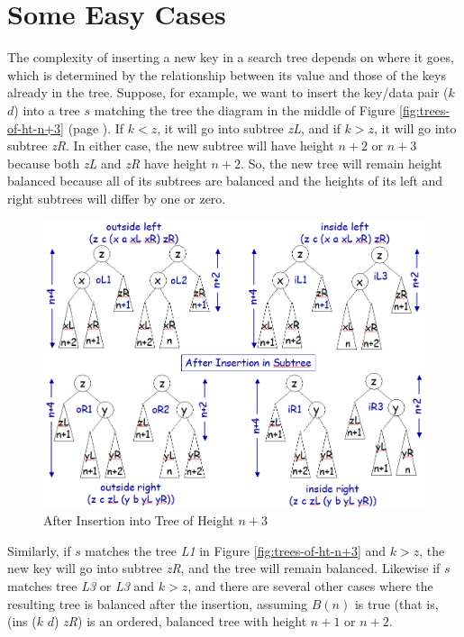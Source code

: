 \section{Some Easy Cases}
The complexity of inserting a new key in a search tree
depends on where it goes, which is determined by the
relationship between its value and those of the keys
already in the tree.
Suppose, for example, we want to insert the key/data pair ($k$ $d$)
into a tree $s$ matching the tree the diagram in the middle of
Figure \ref{fig:trees-of-ht-n+3} (page \pageref{fig:trees-of-ht-n+3}).
If $k < z$, it will go into subtree \emph{zL}, and
if $k > z$, it will go into subtree \emph{zR}.
In either case, the new subtree will have height $n+2$ or $n+3$
because both \emph{zL} and \emph{zR} have height $n+2$.
So, the new tree will remain height balanced because
all of its subtrees are balanced and the heights of its
left and right subtrees will differ by one or zero.

\begin{figure}
\begin{center}
\includegraphics[scale=0.5]{images/outside-inside.png}
\end{center}
\caption{After Insertion into Tree of Height $n+3$}
\label{fig:outside-inside}
\end{figure}

Similarly, if $s$ matches the tree \emph{L1} in
Figure \ref{fig:trees-of-ht-n+3} and $k > z$,
the new key will go into subtree \emph{zR},
and the tree will remain balanced.
Likewise if $s$ matches tree \emph{L3} or \emph{L3}
and $k > z$, and there are several other cases where
the resulting tree is balanced after the insertion,
assuming $B(n)$ is true (that is, (ins ($k$ $d$) \emph{zR})
is an ordered, balanced tree with height $n+1$ or $n+2$.

